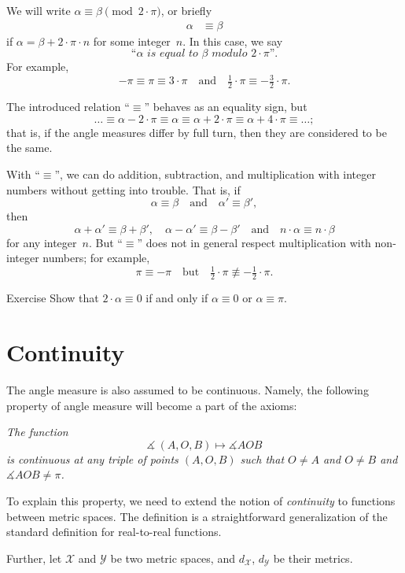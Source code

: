 We will write $\alpha\equiv\beta\pmod{2\cdot\pi}$, or briefly
\begin{align*}
\alpha&\equiv\beta
\end{align*}
if $\alpha=\beta+2\cdot\pi\cdot n$
for some integer~$n$.
In this case, we say 
$$\textit{``$\alpha$ is equal to $\beta$ modulo $2\cdot\pi$''}.$$
For example, 
$$-\pi
\equiv
\pi\equiv 3\cdot\pi
\quad
\text{and}
\quad
\tfrac12\cdot\pi
\equiv
-\tfrac32\cdot\pi.$$

The introduced relation ``$\equiv$'' behaves as an equality sign,
but
\[\dots\equiv\alpha-2\cdot\pi\equiv \alpha\equiv \alpha+2\cdot\pi\equiv \alpha+4\cdot\pi\equiv\dots;\] 
that is, if the angle measures differ by full turn,
then they are considered to be the same.

With ``$\equiv$'', we can do addition, subtraction, and multiplication with integer numbers without getting into trouble.
That is, if
$$\alpha\equiv\beta
\quad
\text{and}
\quad
\alpha'\equiv \beta',$$ 
then
$$\alpha+\alpha'\equiv\beta+\beta',
\quad
\alpha-\alpha'\equiv \beta-\beta'
\quad 
\text{and}
\quad
n\cdot\alpha\equiv n\cdot\beta$$
for any integer~$n$.
But ``$\equiv$'' does not in general respect multiplication with non-integer numbers; for example, 
$$\pi
\equiv 
-\pi
\quad
\text{but}
\quad
\tfrac12\cdot\pi
\not\equiv
-\tfrac12\cdot\pi.$$ 

\begin{thm}{Exercise}\label{ex:2a=0}
Show that $2\cdot\alpha\equiv0$ if and only if $\alpha\equiv0$ or $\alpha\equiv\pi$.
\end{thm}

\section{Continuity}

The angle measure is also assumed to be continuous.
Namely, the following property of angle measure will become a part of the axioms:

\textit{The function}
$$\measuredangle\:(A,O,B)\mapsto\measuredangle A O B$$
\textit{is continuous at any triple of points $(A,O,B)$
such that $O\ne A$ and $O\ne B$ and $\measuredangle A O B\ne\pi$.}

To explain this property, we need to extend the notion of {}\emph{continuity} to functions between metric spaces.
The definition is a straightforward generalization of the standard definition for real-to-real functions.

Further, let $\mathcal X$ and $\mathcal Y$ be two metric spaces,
and $d_{\mathcal X}$, $d_{\mathcal Y}$ be their metrics.

